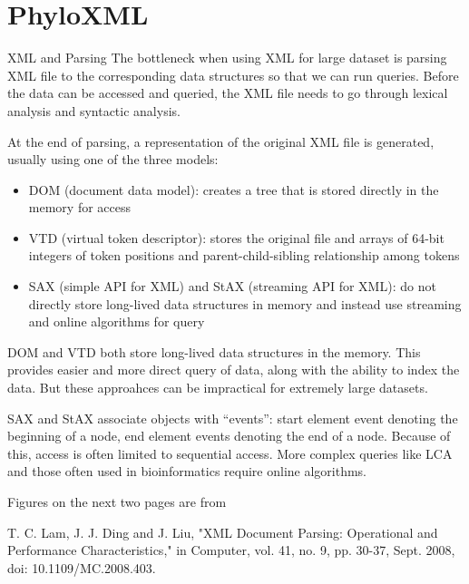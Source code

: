 \documentclass{beamer}
\begin{document}
\section{PhyloXML}

\begin{frame}{XML and Parsing}
    The bottleneck when using XML for large dataset is parsing XML file to the corresponding data structures so that we can run queries. Before the data can be accessed and queried, the XML file needs to go through lexical analysis and syntactic analysis.

    At the end of parsing, a representation of the original XML file is generated, usually using one of the three models:
    \begin{itemize}
        \item DOM (document data model): creates a tree that is stored directly in the memory for access
        \item VTD (virtual token descriptor): stores the original file and arrays of 64-bit integers of token positions and parent-child-sibling relationship among tokens
        \item SAX (simple API for XML) and StAX (streaming API for XML): do not directly store long-lived data structures in memory and instead use streaming and online algorithms for query
    \end{itemize}
\end{frame}

\begin{frame}
    DOM and VTD both store long-lived data structures in the memory. This provides easier and more direct query of data, along with the ability to index the data. But these approahces can be impractical for extremely large datasets.

    SAX and StAX associate objects with ``events'': start element event denoting the beginning of a node, end element events denoting the end of a node. Because of this, access is often limited to sequential access. More complex queries like LCA and those often used in bioinformatics require online algorithms.
\end{frame}

\begin{frame}
    Figures on the next two pages are from 
    
    {T. C. Lam, J. J. Ding and J. Liu, "XML Document Parsing: Operational and Performance Characteristics," in Computer, vol. 41, no. 9, pp. 30-37, Sept. 2008, doi: 10.1109/MC.2008.403.}
\end{frame}
\end{document}
